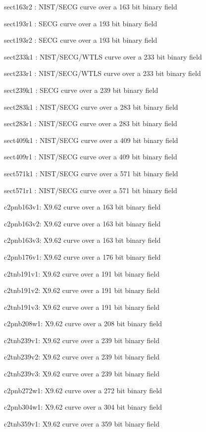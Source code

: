 \item   sect163r2 : NIST/SECG curve over a 163 bit binary field
\item   sect193r1 : SECG curve over a 193 bit binary field
\item   sect193r2 : SECG curve over a 193 bit binary field
\item   sect233k1 : NIST/SECG/WTLS curve over a 233 bit binary field
\item   sect233r1 : NIST/SECG/WTLS curve over a 233 bit binary field
\item   sect239k1 : SECG curve over a 239 bit binary field
\item   sect283k1 : NIST/SECG curve over a 283 bit binary field
\item   sect283r1 : NIST/SECG curve over a 283 bit binary field
\item   sect409k1 : NIST/SECG curve over a 409 bit binary field
\item   sect409r1 : NIST/SECG curve over a 409 bit binary field
\item   sect571k1 : NIST/SECG curve over a 571 bit binary field
\item   sect571r1 : NIST/SECG curve over a 571 bit binary field
\item   c2pnb163v1: X9.62 curve over a 163 bit binary field
\item   c2pnb163v2: X9.62 curve over a 163 bit binary field
\item   c2pnb163v3: X9.62 curve over a 163 bit binary field
\item   c2pnb176v1: X9.62 curve over a 176 bit binary field
\item   c2tnb191v1: X9.62 curve over a 191 bit binary field
\item   c2tnb191v2: X9.62 curve over a 191 bit binary field
\item   c2tnb191v3: X9.62 curve over a 191 bit binary field
\item   c2pnb208w1: X9.62 curve over a 208 bit binary field
\item   c2tnb239v1: X9.62 curve over a 239 bit binary field
\item   c2tnb239v2: X9.62 curve over a 239 bit binary field
\item   c2tnb239v3: X9.62 curve over a 239 bit binary field
\item   c2pnb272w1: X9.62 curve over a 272 bit binary field
\item   c2pnb304w1: X9.62 curve over a 304 bit binary field
\item   c2tnb359v1: X9.62 curve over a 359 bit binary field
